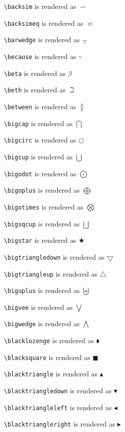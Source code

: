\texttt{\textbackslash backsim} is rendered as $\backsim$

\texttt{\textbackslash backsimeq} is rendered as $\backsimeq$

\texttt{\textbackslash barwedge} is rendered as $\barwedge$

\texttt{\textbackslash because} is rendered as $\because$

\texttt{\textbackslash beta} is rendered as $\beta$

\texttt{\textbackslash beth} is rendered as $\beth$

\texttt{\textbackslash between} is rendered as $\between$

\texttt{\textbackslash bigcap} is rendered as $\bigcap$

\texttt{\textbackslash bigcirc} is rendered as $\bigcirc$

\texttt{\textbackslash bigcup} is rendered as $\bigcup$

\texttt{\textbackslash bigodot} is rendered as $\bigodot$

\texttt{\textbackslash bigoplus} is rendered as $\bigoplus$

\texttt{\textbackslash bigotimes} is rendered as $\bigotimes$

\texttt{\textbackslash bigsqcup} is rendered as $\bigsqcup$

\texttt{\textbackslash bigstar} is rendered as $\bigstar$

\texttt{\textbackslash bigtriangledown} is rendered as $\bigtriangledown$

\texttt{\textbackslash bigtriangleup} is rendered as $\bigtriangleup$

\texttt{\textbackslash biguplus} is rendered as $\biguplus$

\texttt{\textbackslash bigvee} is rendered as $\bigvee$

\texttt{\textbackslash bigwedge} is rendered as $\bigwedge$

\texttt{\textbackslash blacklozenge} is rendered as $\blacklozenge$

\texttt{\textbackslash blacksquare} is rendered as $\blacksquare$

\texttt{\textbackslash blacktriangle} is rendered as $\blacktriangle$

\texttt{\textbackslash blacktriangledown} is rendered as $\blacktriangledown$

\texttt{\textbackslash blacktriangleleft} is rendered as $\blacktriangleleft$

\texttt{\textbackslash blacktriangleright} is rendered as $\blacktriangleright$

